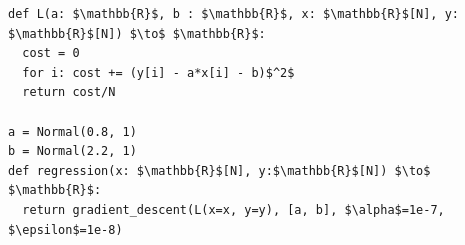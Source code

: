 \documentclass[border=10pt]{standalone}
\begin{document}
\begin{lstlisting}
def L(a: $\mathbb{R}$, b : $\mathbb{R}$, x: $\mathbb{R}$[N], y: $\mathbb{R}$[N]) $\to$ $\mathbb{R}$:
  cost = 0
  for i: cost += (y[i] - a*x[i] - b)$^2$
  return cost/N

a = Normal(0.8, 1)
b = Normal(2.2, 1)
def regression(x: $\mathbb{R}$[N], y:$\mathbb{R}$[N]) $\to$ $\mathbb{R}$:	
  return gradient_descent(L(x=x, y=y), [a, b], $\alpha$=1e-7, $\epsilon$=1e-8)
\end{lstlisting}
\end{document}
